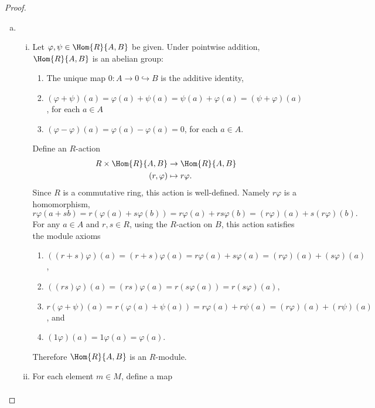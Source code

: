 \documentclass[10pt]{amsart}
\begin{document}
\begin{thm}
\begin{proof}
  \begin{enumerate}[(a)]
  \item
    \begin{enumerate}[(i)]
    \item
      Let $\varphi, \psi \in \Hom{R}{A,B}$ be given.
      Under pointwise addition, $\Hom{R}{A,B}$ is an abelian group:
      \begin{enumerate}
      \item
	The unique map $0 \colon A \rightarrow 0 \hookrightarrow B$ is the additive identity,
      \item
	$(\varphi + \psi)(a) = \varphi(a) + \psi(a) = \psi(a) + \varphi(a) = (\psi + \varphi)(a)$, for each $a \in A$
      \item
	$(\varphi - \varphi)(a) = \varphi(a) - \varphi(a) = 0$, for each $a \in A$.
      \end{enumerate}
      Define an $R$-action
      \begin{align*}
	R \times \Hom{R}{A,B} &\rightarrow \Hom{R}{A,B}\\
	(r, \varphi) &\mapsto r\varphi.
      \end{align*}
      Since $R$ is a commutative ring, this action is well-defined.  Namely $r\varphi$ is a homomorphism,
      $$r\varphi(a + sb) = r(\varphi(a) + s\varphi(b)) = r\varphi(a) + rs\varphi(b) = (r\varphi)(a) + s(r\varphi)(b).$$
      For any $a \in A$ and $r, s \in R$, using the $R$-action on $B$, this action satisfies the module axioms
      \begin{enumerate}
      \item
	$((r + s)\varphi)(a) = (r + s)\varphi(a) = r\varphi(a) + s\varphi(a) = (r\varphi)(a) + (s\varphi)(a)$,
      \item
	$((rs)\varphi)(a) = (rs)\varphi(a) = r(s\varphi(a)) = r(s\varphi)(a)$,
      \item
	$r(\varphi + \psi)(a) = r(\varphi(a) + \psi(a)) = r\varphi(a) + r\psi(a) = (r\varphi)(a) + (r\psi)(a)$, and
      \item
	$(1\varphi)(a) = 1 \varphi(a) = \varphi(a)$.
      \end{enumerate}
      Therefore $\Hom{R}{A,B}$ is an $R$-module.
    \item
      For each element $m \in M$, define a map 
      \begin{align*}

\end{align*}
\end{enumerate}
\end{enumerate}
\end{proof}
\end{thm}
\end{document}
